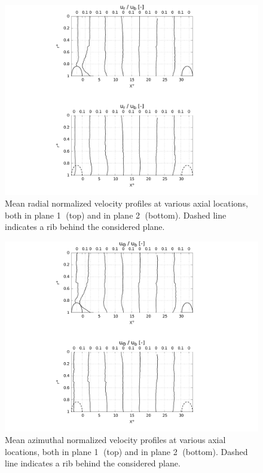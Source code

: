 \begin{figure}[!h]
\centering
\includegraphics[width=0.7\linewidth,keepaspectratio]{fig/applications/optim/Radial_vel.pdf}
\caption{Mean radial normalized velocity profiles at various axial locations, both in plane \textcircled{1} (top) and in plane \textcircled{2} (bottom). Dashed line indicates a rib behind the considered plane.}
\label{Ur_mean}
\end{figure}

\begin{figure}[h!]
\centering
\includegraphics[width=0.7\linewidth,keepaspectratio]{fig/applications/optim/Azimuthal_vel.pdf}
\caption{Mean azimuthal normalized velocity profiles at various axial locations, both in plane \textcircled{1} (top) and in plane \textcircled{2} (bottom). Dashed line indicates a rib behind the considered plane.}
\label{Uw_mean}
\end{figure}

